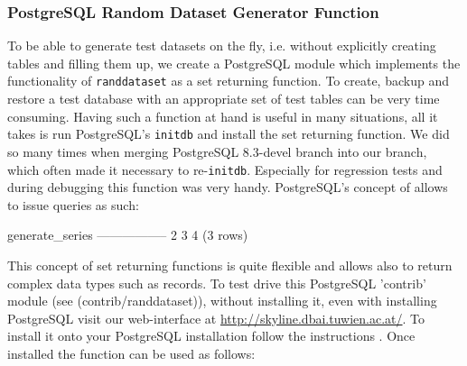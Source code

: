 \subsubsection{PostgreSQL Random Dataset Generator Function}
\label{sec:set-returning-function}

To be able to generate test datasets on the fly, i.e. without
explicitly creating tables and filling them up, we create a PostgreSQL
module which implements the functionality of \texttt{randdataset} as a
set returning function. To create, backup and restore a test database
with an appropriate set of test tables can be very time
consuming. Having such a function at hand is useful in many situations,
all it takes is run PostgreSQL's \texttt{initdb} and install the set
returning function. We did so many times when merging PostgreSQL
8.3-devel branch into our branch, which often made it necessary to
re-\texttt{initdb}. Especially for regression tests and during
debugging this function was very handy. PostgreSQL's concept of
 allows to
issue queries as such:

\begin{interactive}
 generate_series
-----------------
               2
               3
               4
(3 rows)
\end{interactive}

This concept of set returning functions is quite flexible and allows
also to return complex data types such as records. To test drive this
PostgreSQL 'contrib' module (see
\srcref(contrib/randdataset)), without installing it, even with
installing PostgreSQL visit our web-interface at
\url{http://skyline.dbai.tuwien.ac.at/}. To install it onto your
PostgreSQL installation follow the instructions
. Once installed the
function can be used as follows:

